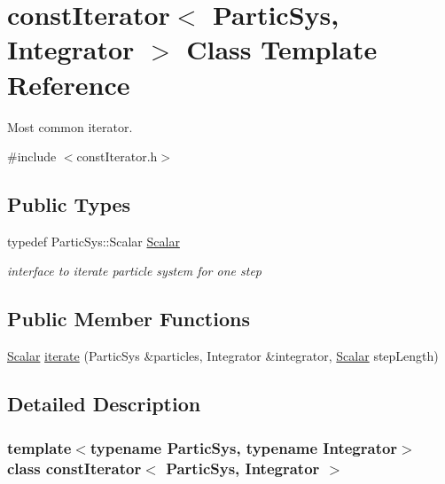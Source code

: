 \hypertarget{classconst_iterator}{}\section{const\+Iterator$<$ Partic\+Sys, Integrator $>$ Class Template Reference}
\label{classconst_iterator}


Most common iterator.  




{\ttfamily \#include $<$const\+Iterator.\+h$>$}

\subsection*{Public Types}
\begin{DoxyCompactItemize}
\item 
typedef Partic\+Sys\+::\+Scalar \mbox{\hyperlink{classconst_iterator_a7cdf84749facbb55a6a2674646f92f52}{Scalar}}
\begin{DoxyCompactList}\small\item\em interface to iterate particle system for one step \end{DoxyCompactList}\end{DoxyCompactItemize}
\subsection*{Public Member Functions}
\begin{DoxyCompactItemize}
\item 
\mbox{\hyperlink{classconst_iterator_a7cdf84749facbb55a6a2674646f92f52}{Scalar}} \mbox{\hyperlink{classconst_iterator_ac38af18a50fbb2aea54656f089911a48}{iterate}} (Partic\+Sys \&particles, Integrator \&integrator, \mbox{\hyperlink{classconst_iterator_a7cdf84749facbb55a6a2674646f92f52}{Scalar}} step\+Length)
\end{DoxyCompactItemize}


\subsection{Detailed Description}
\subsubsection*{template$<$typename Partic\+Sys, typename Integrator$>$\newline
class const\+Iterator$<$ Partic\+Sys, Integrator $>$}

